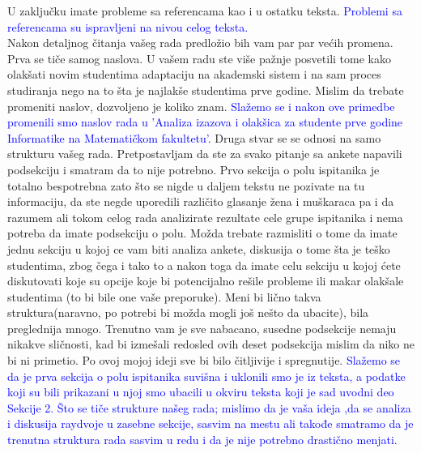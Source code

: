 \documentclass[a4paper]{report}
\newcommand{\odgovor}[1]{\textcolor{blue}{#1}}
\begin{document}
U zaključku imate probleme sa referencama kao i u ostatku teksta. \odgovor{Problemi sa referencama su ispravljeni na nivou celog teksta.} \\

Nakon detaljnog čitanja vašeg rada predložio bih vam par par većih promena.
Prva se tiče samog naslova. U vašem radu ste više pažnje posvetili tome kako olakšati novim studentima adaptaciju na akademski sistem i na sam proces studiranja nego na to šta je najlakše studentima prve godine. Mislim da trebate promeniti naslov, dozvoljeno je koliko znam. \odgovor{Slažemo se i nakon ove primedbe promenili smo naslov rada u 'Analiza izazova i olakšica za studente prve godine Informatike na Matematičkom fakultetu'.}
Druga stvar se se odnosi na samo strukturu vašeg rada. Pretpostavljam da ste za svako pitanje sa ankete napavili podsekciju i smatram da to nije potrebno. Prvo sekcija o polu ispitanika je totalno bespotrebna zato što se nigde u daljem tekstu ne pozivate na tu informaciju, da ste negde uporedili različito glasanje žena i muškaraca pa i da razumem ali tokom celog rada analizirate rezultate cele grupe ispitanika i nema potreba da imate podsekciju o polu.
Možda trebate razmisliti o tome da imate jednu sekciju u kojoj ce vam biti analiza ankete, diskusija o tome šta je teško studentima, zbog čega i tako to a nakon toga da imate celu sekciju u kojoj ćete diskutovati koje su opcije koje bi potencijalno rešile probleme ili makar olakšale studentima (to bi bile one vaše preporuke).
Meni bi lično takva struktura(naravno, po potrebi bi možda mogli još nešto da ubacite), bila preglednija mnogo. Trenutno vam je sve nabacano, susedne podsekcije nemaju nikakve sličnosti, kad bi izmešali redosled ovih deset podsekcija mislim da niko ne bi ni primetio. Po ovoj mojoj ideji sve bi bilo čitljivije i spregnutije. \odgovor{Slažemo se da je prva sekcija o polu ispitanika suvišna i uklonili smo je iz teksta, a podatke koji su bili prikazani u njoj smo ubacili u okviru teksta koji je sad uvodni deo Sekcije 2. Što se tiče strukture našeg rada; mislimo da je vaša ideja ,da se analiza i diskusija raydvoje u zasebne sekcije, sasvim na mestu ali takođe smatramo da je trenutna struktura rada sasvim u redu i da je nije potrebno drastično menjati. }
\end{document}
